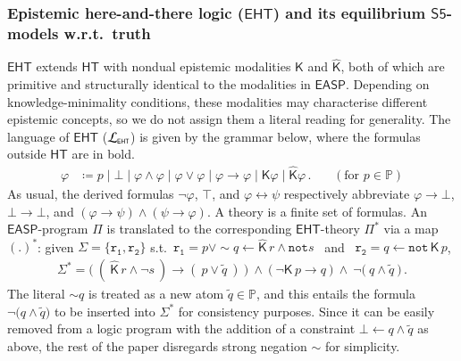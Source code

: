 \documentclass[submission,copyright,creativecommons]{eptcs}
\newcommand{\bnf}  { \coloneqq }
\renewcommand{\phi}  { \varphi }
\newcommand{\lang}[1]  { {\cal L}_{#1} }
\newcommand{\classnot}  { {\sim} }
\newcommand{\Prop}  { \mathbb{P} }
\newcommand{\set}[1]  { \{ #1 \} }
\newcommand{\logic}[1]  { \ensuremath{\mathsf{#1}} }
\newcommand{\sfive}  { \logic{S5} }
\newcommand{\HT}  { \logic{HT} }
\newcommand{\EHT}  { \logic{EHT} }
\newcommand{\EASP}  { \logic{EASP} }
\newcommand{\lpnot}  { \mathtt{not} \, }
\newcommand{\notlp}  { \mathtt{not} }
\newcommand{\intimp}  { \rightarrow }
\newcommand{\intnot}  { \neg }
\newcommand{\trOf}[1]  { #1 ^* }
\newcommand{\epispec}  { \Pi }
\newcommand{\K}  { \mathsf{K} }
\newcommand{\Khat}  { \hat{\mathsf{K}} }
\newcommand{\negof}[1]  { \widetilde{#1} }
\begin{document}
\subsubsection{Epistemic here-and-there logic {\normalfont (\texorpdfstring{$\EHT$}{EHT})} 
and its equilibrium \texorpdfstring{$\sfive$}{sfive}-models
w.r.t.\ truth}
\label{subsubsection:EHT.FHS}
$\EHT$ extends $\HT$ with nondual epistemic modalities $\K$ and $\Khat$, both of which are primitive and structurally identical to the modalities in $\EASP$. 
Depending on knowledge-minimality conditions, 
these modalities may characterise different epistemic concepts, so
we do not assign them a literal reading for generality.
The language of $\EHT$ ($\lang{\scriptscriptstyle{\EHT}}$) is given by the 
grammar below, where the formulas outside $\HT$ are in bold.
%
\begin{align*}
\phi & \bnf p \mid \bot \mid \phi \land \phi \mid \phi \lor \phi \mid
\phi \intimp \phi \mid \boldsymbol{\K} \phi \mid 
\boldsymbol{\Khat} \phi \,.  ~~~~~~~~ (\text{for } p \in \Prop)
\end{align*}
%
As usual, the derived formulas $\intnot \phi$, $\top$, and $\phi \leftrightarrow \psi$ 
respectively abbreviate $\phi \intimp \bot$,
$\bot \intimp \bot$, and $(\phi \intimp \psi) \land (\psi \intimp \phi)$.
A theory is a finite set of formulas.
%
An $\EASP$-program $\epispec$ is translated to the corresponding
$\EHT$-theory $\trOf{\epispec}$ via a map $\trOf{(.)}$: given
$\Sigma =  \set{\mathtt{r_1}, \mathtt{r_2}}$ s.t.\ $ \mathtt{r_1}=
p \lor \classnot q \leftarrow \Khat\, r \land \notlp  s$ \ and \ 
$\mathtt{r_2}= q \leftarrow \lpnot \K\, p$,
%
\begin{align*}
\trOf{\Sigma} = \big(\ (\ \Khat\, r \land \intnot s \ ) \intimp ( \ p \lor \negof{q} \ )  \ \big)
~\land~ \big(\ \intnot \K\, p \intimp q \ \big)
~\land~ \intnot \big(\ q \land \negof{q} \ \big)\, .
\end{align*}
%
The literal $\classnot q$ is treated
as a new atom $\negof{q} \in \Prop$, and this
entails the formula $\intnot \big(q \land \negof{q})$ 
to be inserted into $\trOf{\Sigma}$ for consistency purposes.
Since it can be easily removed from a logic program with the addition of a constraint 
$\bot \leftarrow q \land \negof{q}$ as above, the rest of the paper disregards strong negation $\classnot$ for simplicity.
\end{document}
